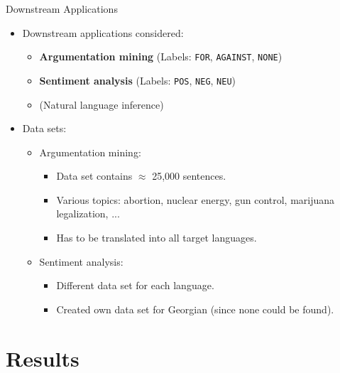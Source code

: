 \documentclass[accentcolor=tud1a,colorbacktitle,inverttitle,landscape,german,presentation,t]{tudbeamer}
\begin{document}
\begin{frame}{Downstream Applications}{}
	\vspace*{-4mm}
	\begin{itemize}\setlength\itemsep{1em}
		\item Downstream applications considered:
		\begin{itemize}
			\item \textbf{Argumentation mining} (Labels: \texttt{FOR}, \texttt{AGAINST}, \texttt{NONE})
			\item \textbf{Sentiment analysis} (Labels: \texttt{POS}, \texttt{NEG}, \texttt{NEU})
			\item (Natural language inference)
		\end{itemize}
		\item Data sets:
		\begin{itemize}
			\item Argumentation mining:
			\begin{itemize}
				\item Data set contains $\approx$ 25,000 sentences.
				\item Various topics: abortion, nuclear energy, gun control, marijuana legalization, ...
				\item Has to be translated into all target languages. \textcolor{green}{}
			\end{itemize}
			\item Sentiment analysis:
			\begin{itemize}
				\item Different data set for each language.
				\item Created own data set for Georgian (since none could be found).
			\end{itemize}
		\end{itemize}
	\end{itemize}

\end{frame}


\section{Results}
\end{document}
